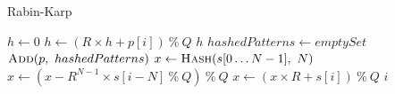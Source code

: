 \documentclass[11pt]{article}
\begin{document}
\begin{algorithm}[H]
\caption{Rabin-Karp}
\begin{algorithmic}
        \State $h \gets 0$
            \State $h \gets (R \times h + p[i])\ \%\ Q$
        \EndFor
        \State \Return $h$
    \EndFunction
        \State $hashedPatterns \gets emptySet$
            \State $\Call{Add}{p,\ hashedPatterns}$
        \EndFor
        \State $x \gets \Call{Hash}{s[0 \ldots N-1],\ N}$
            \State {}
        \EndIf
            \State $x \gets (x - R^{N-1} \times s[i-N]\ \%\ Q)\ \%\ Q$ 
            \State $x \gets (x \times R + s[i])\ \%\ Q$ 
                \State \Return $i$
            \EndIf
        \EndFor
    \EndFunction
\end{algorithmic}
\end{algorithm}
\end{document}
